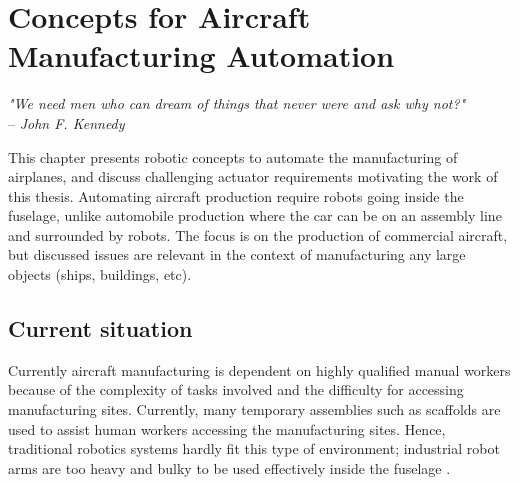 \chapter{Concepts for Aircraft Manufacturing Automation}
\label{sec:VisionForAircraftManufacturingAutomation}

\begin{flushright}
{
\textit{"We need men who can dream of things that never were and ask why not?"}\\
  -- \emph{John F. Kennedy}
%
}
\end{flushright}
\vspace{+10pt}

This chapter presents robotic concepts to automate the manufacturing of airplanes, and discuss challenging actuator requirements motivating the work of this thesis. Automating aircraft production require robots going inside the fuselage, unlike automobile production where the car can be on an assembly line and surrounded by robots. The focus is on the production of commercial aircraft, but discussed issues are relevant in the context of manufacturing any large objects (ships, buildings, etc).



\section{Current situation}
\label{sec:CurrentSituation}


Currently aircraft manufacturing is dependent on highly qualified manual workers because of the complexity of tasks involved and the difficulty for accessing manufacturing sites. Currently, many temporary assemblies such as scaffolds are used to assist human workers accessing the manufacturing sites. Hence, traditional robotics systems hardly fit this type of environment; industrial robot arms are too heavy and bulky to be used effectively inside the fuselage \cite{parietti_supernumerary_2014} \cite{menon_design_2011}. 

